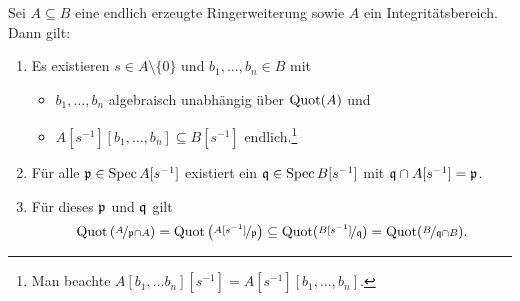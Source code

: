 \documentclass[12pt,a4paper]{scrartcl}
\theoremstyle{cplain}
\theoremstyle{cdef}
\begin{document}

\begin{kor} \label{kor:7.17}
	Sei $A \subseteq B$ eine endlich erzeugte Ringerweiterung sowie $A$ ein Integritätsbereich. Dann gilt: 
	\begin{enumerate}
		\item \label{kor:7.17:i} Es existieren $s \in A \setminus \{0\}$ und $b_1, \dots , b_n \in B$ mit
		\begin{itemize}
			\item $b_1, \dots , b_n$ algebraisch unabhängig über $\operatorname{Quot}(A)$ und
			\item $A[s^{-1}][b_1,\dots , b_n] \subseteq B[s^{-1}]$ endlich.\footnote{Man beachte $A[b_1, \dots b_n][s^{-1}]=A[s^{-1}][b_1, \dots , b_n]$.}
		\end{itemize}
		\item \label{kor:7.17:ii} Für alle $\mathfrak{p}\in\operatorname{Spec} A [s^{-1}]$ existiert ein $\mathfrak{q} \in \operatorname{Spec} B[s^{-1}]$ mit $\mathfrak{q} \cap A[s^{-1}]=\mathfrak{p}$. 
		\item \label{kor:7.17:iii}  Für dieses $\mathfrak{p}$ und $\mathfrak{q}$ gilt \[\operatorname{Quot}\left( \nicefrac{A}{\mathfrak{p} \cap A} \right)=\operatorname{Quot} \left( \nicefrac{A[s^{-1}]}{\mathfrak{p}} \right) \subseteq \operatorname{Quot}(\nicefrac{B[s^{-1}]}{\mathfrak{q}})=\operatorname{Quot}(\nicefrac{B}{\mathfrak{q} \cap B}).\]
	\end{enumerate}
\end{kor}
\end{document}

